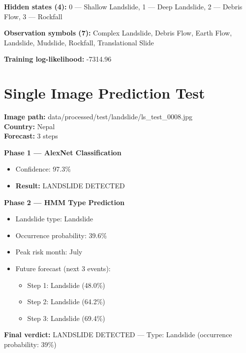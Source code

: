 \documentclass[11pt]{article}
\begin{document}
\noindent\textbf{Hidden states (4):}
0 — Shallow Landslide, 1 — Deep Landslide, 2 — Debris Flow, 3 — Rockfall

\noindent\textbf{Observation symbols (7):}
Complex Landslide, Debris Flow, Earth Flow, Landslide, Mudslide, Rockfall, Translational Slide

\noindent\textbf{Training log-likelihood:} -7314.96

\section{Single Image Prediction Test}

\noindent \textbf{Image path:} data/processed/test/landslide/ls\_test\_0008.jpg \\
\textbf{Country:} Nepal \\
\textbf{Forecast:} 3 steps

\vspace{0.3cm}
\noindent \textbf{Phase 1 — AlexNet Classification}
\begin{itemize}[noitemsep]
    \item Confidence: 97.3\%
    \item \textbf{Result:} LANDSLIDE DETECTED
\end{itemize}

\vspace{0.3cm}
\noindent \textbf{Phase 2 — HMM Type Prediction}
\begin{itemize}[noitemsep]
    \item Landslide type: Landslide
    \item Occurrence probability: 39.6\%
    \item Peak risk month: July
    \item Future forecast (next 3 events):
    \begin{itemize}
        \item Step 1: Landslide (48.0\%)
        \item Step 2: Landslide (64.2\%)
        \item Step 3: Landslide (69.4\%)
    \end{itemize}
\end{itemize}

\noindent \textbf{Final verdict:} LANDSLIDE DETECTED — Type: Landslide (occurrence probability: 39\%)
\end{document}
